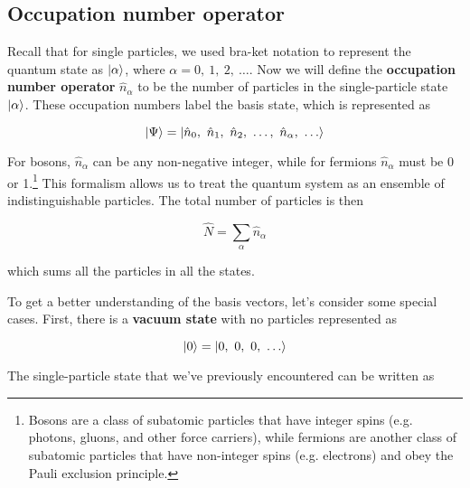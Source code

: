 \subsection{Occupation number operator}

Recall that for single particles, we used bra-ket notation to represent the quantum state as $\ket{\alpha}$, where $\alpha = 0,\ 1,\ 2,\ \dots$. 
Now we will define the \textbf{occupation number operator} $\hat{n}_{\alpha}$ to be the number of particles in the single-particle state $\ket{\alpha}$. 
These occupation numbers label the basis state, which is represented as

\begin{tcolorbox} [title=Basis vector] \vspace{-2ex}
	\begin{equation}
		\ket{\Psi} = \ket{\hat{n}_0,\ \hat{n}_1,\ \hat{n}_2,\ \dots,\ \hat{n}_{\alpha},\ \dots} \label{eq:fock}
	\end{equation}
\end{tcolorbox} 

For bosons, $\hat{n}_{\alpha}$ can be any non-negative integer, while for fermions $\hat{n}_{\alpha}$ must be 0 or 1.\footnote{Bosons are a class of subatomic particles that have integer spins (e.g. photons, gluons, and other force carriers), while fermions are another class of subatomic particles that have non-integer spins (e.g. electrons) and obey the Pauli exclusion principle.} 
This formalism allows us to treat the quantum system as an ensemble of indistinguishable particles. 
The total number of particles is then

\begin{equation}
	\hat{N} = \sum_{\alpha} \hat{n}_{\alpha}
\end{equation}

\noindent which sums all the particles in all the states.

To get a better understanding of the basis vectors, let's consider some special cases. 
First, there is a \textbf{vacuum state} with no particles represented as

\begin{equation}
	\ket{0} = \ket{0,\ 0,\ 0,\ \dots}
\end{equation}

The single-particle state that we've previously encountered can be written as

